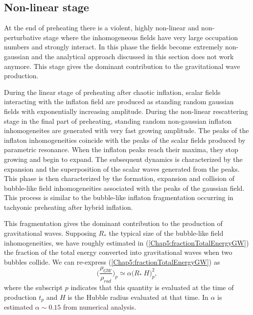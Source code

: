 \documentclass[11pt,a4paper,twoside]{book}
\begin{document}
\subsection{Non-linear stage}
At the end of preheating there is a violent, highly non-linear and non-perturbative stage where the inhomogeneous fields have very large occupation numbers and strongly interact. In this phase the fields become extremely non-gaussian and the analytical approach discussed in this section does not work anymore. This stage gives the dominant contribution to the gravitational wave production.

During the linear stage of preheating after chaotic inflation, scalar fields interacting with the inflaton field are produced as standing random gaussian fields with exponentially increasing amplitude. During the non-linear rescattering stage in the final part of preheating, standing random non-gaussian inflaton inhomogeneites are generated with very fast growing amplitude. The peaks of the inflaton inhomogeneities coincide with the peaks of the scalar fields produced by parametric resonance. When the inflaton peaks  reach their maxima, they stop growing and begin to expand. The subsequent dynamics is characterized by the expansion and the superposition of the scalar waves generated from the peaks. This phase is then characterized by the formation, expansion  and collision of bubble-like field inhomogeneities associated with the peaks of the gaussian field. This process is similar to the bubble-like inflaton fragmentation occurring in tachyonic preheating after hybrid inflation.

This fragmentation gives the dominant contribution to the production of gravitational waves. Supposing $ R_{*} $ the typical size of the bubble-like field inhomogeneities, we have roughly estimated in  (\ref{Chap5:fractionTotalEnergyGW}) the fraction of the total energy converted into gravitational waves when two bubbles collide. We can re-express (\ref{Chap5:fractionTotalEnergyGW}) as
\begin{equation}
	\label{Chap7:fractionTotalEnergyGW}
	\Bigg(\frac{\rho_{GW}}{\rho_{rad}}\Bigg)_{p} \simeq  \alpha \Big( R_{*}\ H\Big)_{p}^{2},
\end{equation}
where the subscript $ p $ indicates that this quantity is evaluated at the time of production $ t_{p} $ and $ H $ is the Hubble radius evaluated at that time. In \cite{Chap7:GreenMethod} $\alpha$ is estimated $\alpha \sim 0.15$ from numerical analysis.
\end{document}
